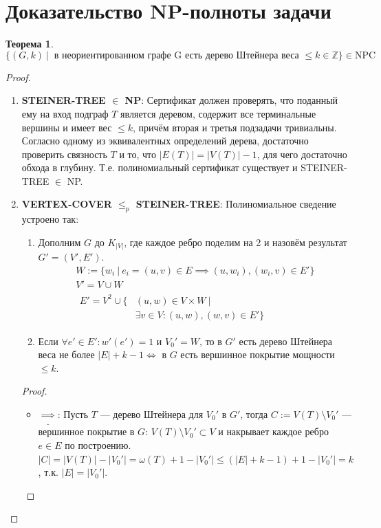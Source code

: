 \documentclass[11pt,a4paper]{report}
\def\Integer{\mathbb{Z}}
\def\le{\leqslant}
\theoremstyle{definition}
\theoremstyle{definition}
\newtheorem{theorem}{Теорема}[section]
\theoremstyle{definition}
\begin{document}
	\section{Доказательство NP-полноты задачи}
	\begin{theorem}
		$$ \{ (G, k)\ |\ \text{ в неориентированном графе G есть дерево Штейнера веса } \le k \in \Integer \} \in \mathrm{NPC} $$
	\end{theorem}
	\begin{proof}$  $
		\begin{enumerate}
			\item \textbf{STEINER-TREE $\in$ NP}: 
				Сертификат должен проверять, что поданный ему на вход подграф $T$ является деревом, содержит все терминальные вершины и имеет вес $\le k$, причём вторая и третья подзадачи тривиальны. Согласно одному из эквивалентных определений дерева, достаточно проверить связность $T$ и то, что $|E(T)| = |V(T)| - 1$, для чего достаточно обхода в глубину. Т.е. полиномиальный сертификат существует и STEINER-TREE $\in$ NP.
			\item \textbf{VERTEX-COVER $\le_{p}$ STEINER-TREE}: Полиномиальное сведение устроено так:
			\begin{enumerate}
				\item Дополним $G$ до $K_{|V|}$, где каждое ребро поделим на 2 и назовём результат $G' = (V', E')$.
				\begin{gather*}
					W := \{ w_i\ |\ e_i = (u, v) \in E \implies (u, w_i), (w_i, v) \in E' \}\\
					V' = V \cup W\\
					\begin{aligned}
						E' = V^2 \cup \{& (u, w) \in V \times W\ |\\
						&\exists v \in V: (u, w), (w, v) \in E' \}
					\end{aligned}
				\end{gather*} 
				\item Если $\forall e' \in E': w'(e') = 1$ и $V_0' = W$, то в $G'$ есть дерево Штейнера веса не более $|E| + k - 1 \iff $ в $G$ есть вершинное покрытие мощности $\le k$.
			\end{enumerate}
			\begin{proof}$  $
				\begin{itemize}
					\item $ \underline{\implies} $: Пусть $T$ — дерево Штейнера для $V_0'$ в $G'$, тогда $C := V(T) \setminus V_0'$ — вершинное покрытие в $G$: $ V(T) \setminus V_0' \subset V$ и накрывает каждое ребро $e \in E$ по построению. $ |C| = |V(T)| - |V_0'| = \omega(T) + 1 - |V_0'| \le (|E| + k - 1) + 1 - |V_0'| = k$, т.к. $|E| = |V_0'|$. 

\end{itemize}
\end{proof}
\end{enumerate}
\end{proof}
\end{document}
